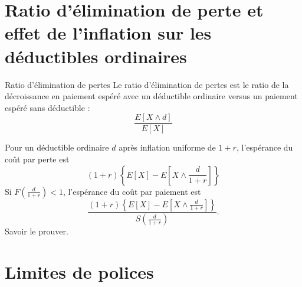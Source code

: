 \section{Ratio d'élimination de perte et effet de l'inflation sur les déductibles ordinaires}

\begin{definition}{Ratio d'élimination de pertes}{}
	Le ratio d'élimination de pertes est le ratio de la décroissance en paiement espéré avec un déductible ordinaire versus un paiement espéré sans déductible : 
	$$\frac{E[X\wedge d]}{E[X]}$$
\end{definition}

\begin{theoreme}{}{}
	Pour un déductible ordinaire $d$ après inflation uniforme de $1 + r$, l'espérance du coût par perte est
	$$(1 + r) \left\{E[X] - E\left[X \wedge \frac{d}{1 + r}\right]\right\}$$
	\tcblower
	Si $F\left(\frac{d}{1+r}\right) < 1$, l'espérance du coût par paiement est 
	$$\frac{(1 + r) \left\{E[X] - E\left[X \wedge \frac{d}{1 + r}\right]\right\}}{S\left(\frac{d}{1 + r}\right)}.$$
	Savoir le prouver. 
\end{theoreme}

\section{Limites de polices}






































